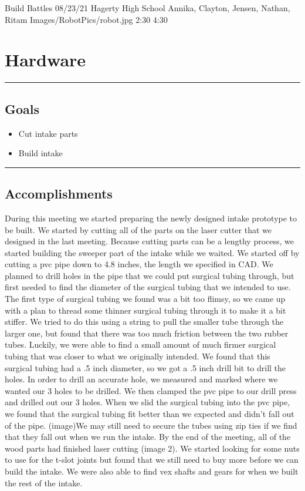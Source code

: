\insertmeeting 
	{Build Battles} 
	{08/23/21}
	{Hagerty High School}
	{Annika, Clayton, Jensen, Nathan, Ritam}
	{Images/RobotPics/robot.jpg}
	{2:30}
  {4:30}
	
\section*{Hardware}
\noindent\hfil\rule{\textwidth}{.4pt}\hfil
\subsection*{Goals}
\begin{itemize}
    \item Cut intake parts
	\item Build intake 

\end{itemize} 

\noindent\hfil\rule{\textwidth}{.4pt}\hfil

\subsection*{Accomplishments}
During this meeting we started preparing the newly designed intake prototype to be built. We started by cutting all of the parts on the laser cutter that we designed in the last meeting. Because cutting parts can be a lengthy process, we started building the sweeper part of the intake while we waited. We started off by cutting a pvc pipe down to 4.8 inches, the length we specified in CAD. We planned to drill holes in the pipe that we could put surgical tubing through, but first needed to find the diameter of the surgical tubing that we intended to use. The first type of surgical tubing we found was a bit too flimsy, so we came up with a plan to thread some thinner surgical tubing through it to make it a bit stiffer. We tried to do this using a string to pull the smaller tube through the larger one, but found that there was too much friction between the two rubber tubes. Luckily, we were able to find a small amount of much firmer surgical tubing that was closer to what we originally intended. We found that this surgical tubing had a .5 inch diameter, so  we got a .5 inch drill bit to drill the holes. In order to drill an accurate hole, we measured and marked where we wanted our 3 holes to be drilled. We then clamped the pvc pipe to our drill press and drilled out our 3 holes. When we slid the surgical tubing into the pvc pipe, we found that the surgical tubing fit better than we expected and didn’t fall out of the pipe. (image)We may still need to secure the tubes using zip ties if we find that they fall out when we run the intake.
By the end of the meeting, all of the wood parts had finished laser cutting (image 2). We started looking for some nuts to use for the t-slot joints but found that we still need to buy more before we can build the intake. We were also able to find vex shafts and gears for when we built the rest of the intake.


